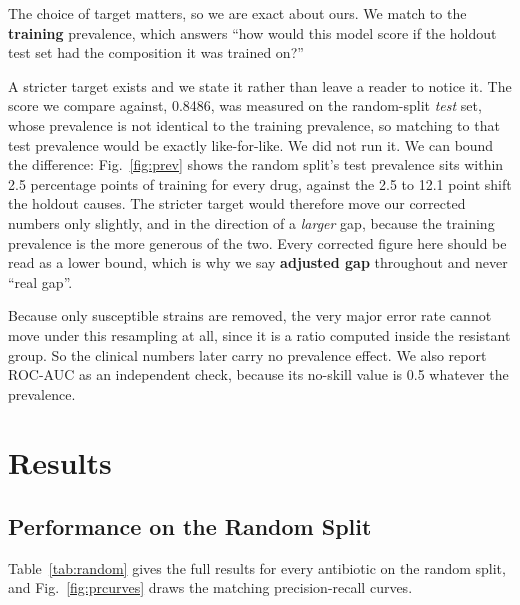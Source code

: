 \documentclass[conference]{IEEEtran}
\begin{document}
The choice of target matters, so we are exact about ours. We match to the
\textbf{training} prevalence, which answers ``how would this model score if the
holdout test set had the composition it was trained on?''

A stricter target exists and we state it rather than leave a reader to notice it.
The score we compare against, 0.8486, was measured on the random-split \textit{test}
set, whose prevalence is not identical to the training prevalence, so matching to
that test prevalence would be exactly like-for-like. We did not run it. We can bound
the difference: Fig.~\ref{fig:prev} shows the random split's test prevalence sits
within 2.5 percentage points of training for every drug, against the 2.5 to 12.1
point shift the holdout causes. The stricter target would therefore move our
corrected numbers only slightly, and in the direction of a \textit{larger} gap,
because the training prevalence is the more generous of the two. Every corrected
figure here should be read as a lower bound, which is why we say \textbf{adjusted
gap} throughout and never ``real gap''.

Because only susceptible strains are removed, the very major error rate cannot move
under this resampling at all, since it is a ratio computed inside the resistant
group. So the clinical numbers later carry no prevalence effect. We also report
ROC-AUC as an independent check, because its no-skill value is 0.5 whatever the
prevalence.

\section{Results}
\label{sec:results}

\subsection{Performance on the Random Split}

Table~\ref{tab:random} gives the full results for every antibiotic on the random
split, and Fig.~\ref{fig:prcurves} draws the matching precision-recall curves.
\end{document}
